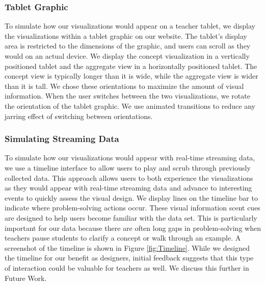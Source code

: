 \documentclass{sigchi}
\begin{document}
\subsubsection{Tablet Graphic}
To simulate how our visualizations would appear on a teacher tablet, we display the visualizations within a tablet graphic on our website. The tablet's display area is restricted to the dimensions of the graphic, and users can scroll as they would on an actual device. We display the concept visualization in a vertically positioned tablet and the aggregate view in a horizontally positioned tablet. The concept view is typically longer than it is wide, while the aggregate view is wider than it is tall. We chose these orientations to maximize the amount of visual information. When the user switches between the two visualizations, we rotate the orientation of the tablet graphic. We use animated transitions to reduce any jarring effect of switching between orientations.

\subsubsection{Simulating Streaming Data}
To simulate how our visualizations would appear with real-time streaming data, we use a timeline interface to allow users to play and scrub through previously collected data. This approach allows users to both experience the visualizations as they would appear with real-time streaming data and advance to interesting events to quickly assess the visual design. We display lines on the timeline bar to indicate where problem-solving actions occur. These visual information scent cues \cite{Willett07} are designed to help users become familiar with the data set. This is particularly important for our data because there are often long gaps in problem-solving when teachers pause students to clarify a concept or walk through an example. A screenshot of the timeline is shown in Figure \ref{fig:Timeline}. While we designed the timeline for our benefit as designers, initial feedback suggests that this type of interaction could be valuable for teachers as well. We discuss this further in Future Work.
\end{document}
